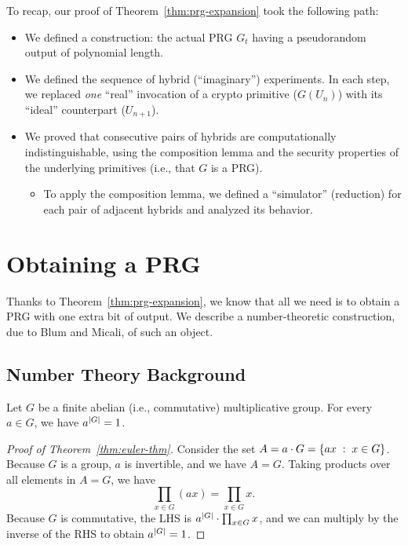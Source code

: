 \documentclass[11pt]{article}
\begin{document}
\noindent To recap, our proof of Theorem~\ref{thm:prg-expansion} took
the following path:
\begin{itemize}
\item We defined a construction: the actual PRG $G_t$ having a
  pseudorandom output of polynomial length.
\item We defined the sequence of hybrid (``imaginary'') experiments.
  In each step, we replaced \emph{one} ``real'' invocation of a crypto
  primitive ($G(U_{n})$) with its ``ideal'' counterpart ($U_{n+1}$).
\item We proved that consecutive pairs of hybrids are computationally
  indistinguishable, using the composition lemma and the security
  properties of the underlying primitives (i.e., that $G$ is a PRG).
  \begin{itemize}
  \item To apply the composition lemma, we defined a
    ``simulator'' (reduction) for each pair of adjacent hybrids and
    analyzed its behavior.
  \end{itemize}
\end{itemize}

\section{Obtaining a PRG}
\label{sec:obtaining-prg}

Thanks to Theorem~\ref{thm:prg-expansion}, we know that all we need is
to obtain a PRG with one extra bit of output.  We describe a
number-theoretic construction, due to Blum and Micali, of such an
object.

\subsection{Number Theory Background}
\label{sec:background}

\begin{theorem}
  \label{thm:euler-thm}
  Let $G$ be a finite abelian (i.e., commutative) multiplicative
  group.  For every $a \in G$, we have $a^{\lvert G\rvert} = 1$.
\end{theorem}

\begin{proof}[Proof of Theorem~\ref{thm:euler-thm}]
  Consider the set $A = a \cdot G = \{ ax\; :\; x \in G\}$.  Because
  $G$ is a group, $a$ is invertible, and we have $A = G$.  Taking
  products over all elements in $A = G$, we have \[ \prod_{x \in G}
  (ax) = \prod_{x \in G} x. \] Because $G$ is commutative, the LHS is
  $a^{\lvert G\rvert} \cdot \prod_{x \in G} x$, and we can multiply by the
  inverse of the RHS to obtain $a^{\lvert G\rvert} = 1$.
\end{proof}
\end{document}
